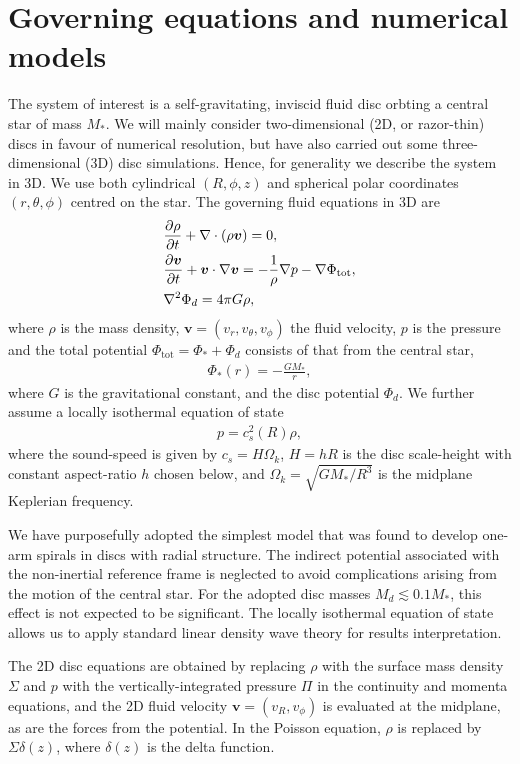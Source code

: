 \section{Governing equations and numerical models}\label{model} 
The system of interest is a self-gravitating, inviscid fluid disc
orbting a central star of mass $M_*$. We will mainly consider two-dimensional
(2D, or razor-thin) discs in favour of numerical
resolution, but have also carried out some three-dimensional (3D) disc
simulations. Hence, for generality we describe the system in
3D. We use both cylindrical $(R,\phi,z)$ and spherical polar
coordinates $(r,\theta,\phi)$ centred on the star. 
The governing fluid equations in 3D are  
\begin{align}
  &\frac{\partial\rho}{\partial t} + \nabla\cdot\left(\rho\bm{v}\right) =
  0,\label{cont_eq}\\
  &\frac{\partial\bm{v}}{\partial t} + \bm{v}\cdot\nabla\bm{v} = -\frac{1}{\rho}\nabla
  p -\nabla \Phi_\mathrm{tot}\label{mom_eq},\\ 
  & \nabla^2\Phi_d = 4 \pi G \rho \label{poisson}, 
\end{align}
where $\rho$ is the mass density, $\bm{v}=(v_r,v_\theta,v_\phi)$ the
fluid velocity, $p$ is the pressure and the total potential
$\Phi_\mathrm{tot} = \Phi_* + \Phi_d$ consists of that from the
central star, 
\begin{align}
  \Phi_*(r) = -\frac{GM_*}{r}, 
\end{align}
where $G$ is the gravitational constant,  and the disc potential
$\Phi_d$. We further assume a locally 
isothermal equation of state 
\begin{align}
  p = c_s^2(R)\rho,
\end{align}
where the sound-speed is given by $c_s=H\Omega_k$, $H=hR$ is the
disc scale-height with constant aspect-ratio $h$ chosen below, and
$\Omega_k=\sqrt{GM_*/R^3}$ is the midplane Keplerian frequency.  

We have purposefully adopted the simplest model that was found to
develop one-arm spirals in discs with radial structure. The indirect
potential associated with the non-inertial reference frame is
neglected to avoid complications arising from the motion of the
central star. For the adopted disc masses $M_d\lesssim 0.1 M_*$, this
effect is not expected to be significant. The locally isothermal
equation of state allows us to apply standard linear density wave
theory for results interpretation. 

The 2D disc equations are obtained by replacing $\rho$ with the surface
mass density $\Sigma$ and $p$ with the vertically-integrated pressure
$\Pi$ in the continuity and momenta equations, and the 2D fluid
velocity $\bm{v}=(v_R,v_\phi)$ is evaluated at the midplane, as are
the forces from the potential. In the Poisson equation, $\rho$ is
replaced by $\Sigma\delta(z)$, where $\delta(z)$ is the
delta function. 

